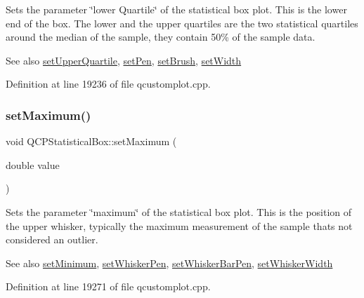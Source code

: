 Sets the parameter \char`\"{}lower Quartile\char`\"{} of the statistical box plot. This is the lower end of the box. The lower and the upper quartiles are the two statistical quartiles around the median of the sample, they contain 50\% of the sample data.

\begin{DoxySeeAlso}{See also}
\hyperlink{class_q_c_p_statistical_box_a65a1375f941c5a2077b5201229e89346}{set\+Upper\+Quartile}, \hyperlink{class_q_c_p_abstract_plottable_ab74b09ae4c0e7e13142fe4b5bf46cac7}{set\+Pen}, \hyperlink{class_q_c_p_abstract_plottable_a7a4b92144dca6453a1f0f210e27edc74}{set\+Brush}, \hyperlink{class_q_c_p_statistical_box_a0b62775bd67301b1eba5c785f2b26f14}{set\+Width} 
\end{DoxySeeAlso}


Definition at line 19236 of file qcustomplot.\+cpp.

\mbox{\label{class_q_c_p_statistical_box_acec5ad1901f00f2c5387cfb4d9787eb3}} 
\subsubsection{\texorpdfstring{set\+Maximum()}{setMaximum()}}
{\footnotesize\ttfamily void Q\+C\+P\+Statistical\+Box\+::set\+Maximum (\begin{DoxyParamCaption}\item[{double}]{value }\end{DoxyParamCaption})}

Sets the parameter \char`\"{}maximum\char`\"{} of the statistical box plot. This is the position of the upper whisker, typically the maximum measurement of the sample that\textquotesingle{}s not considered an outlier.

\begin{DoxySeeAlso}{See also}
\hyperlink{class_q_c_p_statistical_box_a84ff7cc61ba44890f0c3e0c99c19941e}{set\+Minimum}, \hyperlink{class_q_c_p_statistical_box_a4a5034cb3b9b040444df05ab1684620b}{set\+Whisker\+Pen}, \hyperlink{class_q_c_p_statistical_box_aa8d3e503897788e1abf68dc74b5f147f}{set\+Whisker\+Bar\+Pen}, \hyperlink{class_q_c_p_statistical_box_adf378812446bd66f34d1f7f293d991cd}{set\+Whisker\+Width} 
\end{DoxySeeAlso}


Definition at line 19271 of file qcustomplot.\+cpp.

